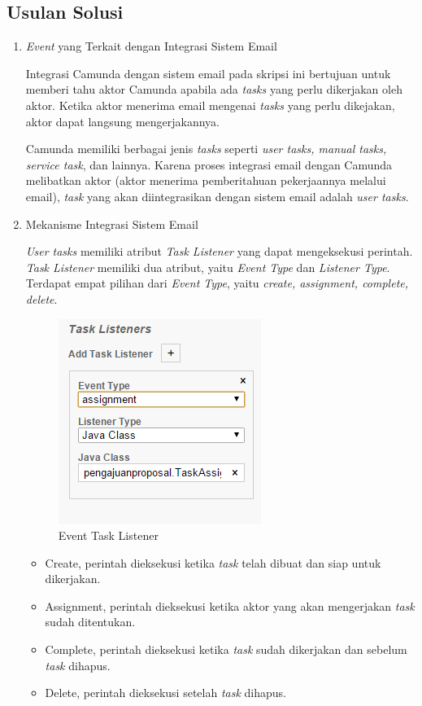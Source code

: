 \subsection{Usulan Solusi}
\label{sec:usulansolusi}

\begin{enumerate}
\item\textit{Event} yang Terkait dengan Integrasi Sistem Email
\label{sec:eventUserTask}

Integrasi Camunda dengan sistem email pada skripsi ini bertujuan untuk memberi tahu aktor Camunda apabila ada \textit{tasks} yang perlu dikerjakan oleh aktor. Ketika aktor menerima email mengenai \textit{tasks} yang perlu dikejakan, aktor dapat langsung mengerjakannya. 

Camunda memiliki berbagai jenis \textit{tasks} seperti \textit{user tasks, manual tasks, service task}, dan lainnya. Karena proses integrasi email dengan Camunda melibatkan aktor (aktor menerima pemberitahuan pekerjaannya melalui email), \textit{task} yang akan diintegrasikan dengan sistem email adalah \textit{user tasks}.

\item Mekanisme Integrasi Sistem Email
\label{integrasi}

\textit{User tasks} memiliki atribut \textit{Task Listener} yang dapat mengeksekusi perintah. \textit{Task Listener} memiliki dua atribut, yaitu \textit{Event Type} dan \textit{Listener Type}. Terdapat empat pilihan dari \textit{Event Type}, yaitu \textit{create, assignment, complete, delete}. 
		\begin{figure}[H]
			\centering
			\includegraphics[scale=1]{Gambar/Bab-3/TaskListener}
			\caption{Event Task Listener} 
			\label{fig:eventtasklistener}
		\end{figure}
\begin{itemize}
	\item Create, perintah dieksekusi ketika \textit{task} telah dibuat dan siap untuk dikerjakan. 
	\item Assignment, perintah dieksekusi ketika aktor yang akan mengerjakan \textit{task} sudah ditentukan.
	\item Complete, perintah dieksekusi ketika \textit{task} sudah dikerjakan dan sebelum \textit{task} dihapus.
	\item Delete, perintah dieksekusi setelah \textit{task} dihapus.
\end{itemize}



\end{enumerate}
